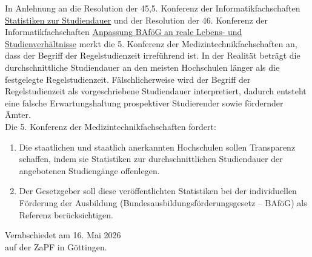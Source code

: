 \documentclass[DIV=calc]{scrartcl}
\let\oldgrqq=\grqq
\def\grqq{\oldgrqq\xspace}
\begin{document}
In Anlehnung an die Resolution der 45,5. Konferenz der Informatikfachschaften \href{https://wiki.kif.rocks/w/index.php?title=KIF455:Statistiken_zur_Studiendauer}{\glqq Statistiken zur 
Studiendauer\grqq} und der Resolution der 46. Konferenz der Informatikfachschaften \href{https://wiki.kif.rocks/wiki/KIF460:Resolutionen/Anpassung_BAf%C3%B6G_an_reale_Lebens-_und_Studienverh%C3%A4ltnisse}{\glqq Anpassung BAföG an 
reale Lebens- und Studienverhältnisse\grqq} merkt die 5. Konferenz der Medizintechnikfachschaften an, dass 
der Begriff der Regelstudienzeit irreführend ist. In der Realität beträgt die durchschnittliche Studiendauer 
an den meisten Hochschulen länger als die festgelegte Regelstudienzeit. Fälschlicherweise wird der 
Begriff der Regelstudienzeit als vorgeschriebene Studiendauer interpretiert, dadurch entsteht eine 
falsche Erwartungshaltung prospektiver Studierender sowie fördernder Ämter.\\
Die 5. Konferenz der Medizintechnikfachschaften fordert:\\
\begin{enumerate}
    \item Die staatlichen und staatlich anerkannten Hochschulen sollen Transparenz schaffen, indem sie 
Statistiken zur durchschnittlichen Studiendauer der angebotenen Studiengänge offenlegen. 
\item Der Gesetzgeber soll diese veröffentlichten Statistiken bei der individuellen Förderung der Ausbildung 
(Bundesausbildungsförderungsgesetz – BAföG) als Referenz berücksichtigen.
\end{enumerate}




\vspace{1cm} 
%
\vfill
\begin{flushright}
	Verabschiedet am 16. Mai 2026 \\
	auf der ZaPF in Göttingen.
\end{flushright}
\end{document}
